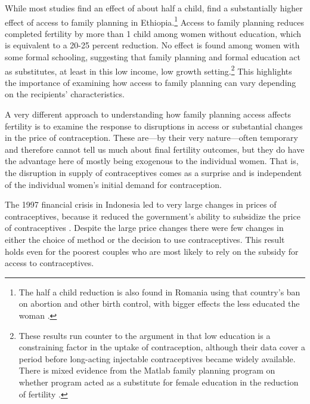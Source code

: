 While most studies find an effect of about half a child, \citet{Portner2011} find a substantially higher effect of access to family planning in Ethiopia.\footnote{The half a child reduction is also found in Romania using that country's ban on abortion and other birth control, with bigger effects the less educated the woman \citep{Pop-Eleches2010}.} Access to family planning reduces completed fertility by more than 1 child among women without education, which is equivalent to a 20-25 percent reduction. No effect is found among women with some formal schooling, suggesting that family planning and formal education act as substitutes, at least in this low income, low growth setting.\footnote{These results run counter to the argument in \citet{Feyisetan1996} that low education is a constraining factor in the uptake of contraception, although their data cover a period before long-acting injectable contraceptives became widely available. There is mixed evidence from the Matlab family planning program on whether program acted as a substitute for female education in the reduction of fertility \citep{Sinha2005,Joshi2007}.} This highlights the importance of examining how access to family planning can vary depending on the recipients' characteristics.

A very different approach to understanding how family planning access affects fertility is to examine the response to disruptions in access or substantial changes in the price of contraception. These are---by their very nature---often temporary and therefore cannot tell us much about final fertility outcomes, but they do have the advantage here of mostly being exogenous to the individual women. That is, the disruption in supply of contraceptives comes as a surprise and is independent of the individual women's initial demand for contraception.

The 1997 financial crisis in Indonesia led to very large changes in prices of contraceptives, because it reduced the government's ability to subsidize the price of contraceptives \citep{McKelvey2012}. Despite the large price changes there were few changes in either the choice of method or the decision to use contraceptives. This result holds even for the poorest couples who are most likely to rely on the subsidy for access to contraceptives.

